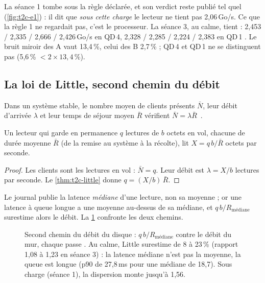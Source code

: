La séance 1 tombe sous la règle déclarée, et son verdict reste publié tel quel (\cref{fig:t2c-e1}) : il dit que \emph{sous cette charge} le lecteur ne tient pas 2,06\,Go/s. Ce que la règle 1 ne regardait pas, c'est le processeur. La séance 3, au calme, tient : 2,453 / 2,335 / 2,666 / 2,426\,Go/s en QD\,4, 2,328 / 2,285 / 2,224 / 2,383 en QD\,1 \mes. Le bruit miroir des A vaut 13,4\,\%, celui des B 2,7\,\% ; QD\,4 et QD\,1 ne se distinguent pas (5,6\,\% $< 2 \times 13{,}4\,\%$).

\subsection{La loi de Little, second chemin du débit}

\begin{theoreme}[Little, 1961]\label{thm:t2c-little}
Dans un système stable, le nombre moyen de clients présents $\bar N$, leur débit d'arrivée $\lambda$ et leur temps de séjour moyen $\bar R$ vérifient $\bar N = \lambda \bar R$~\cite{little1961}.
\end{theoreme}

\begin{corollaire}\label{cor:t2c-little}
Un lecteur qui garde en permanence $q$ lectures de $b$ octets en vol, chacune de durée moyenne $\bar R$ (de la remise au système à la récolte), lit $X = q\,b / \bar R$ octets par seconde.
\end{corollaire}

\begin{proof}
Les clients sont les lectures en vol : $\bar N = q$. Leur débit est $\lambda = X/b$ lectures par seconde. Le \cref{thm:t2c-little} donne $q = (X/b)\,\bar R$.
\end{proof}

Le journal publie la latence \emph{médiane} d'une lecture, non sa moyenne ; or une latence à queue longue a une moyenne au-dessus de sa médiane, et $q\,b/R_{\mathrm{médiane}}$ surestime alors le débit. La \cref{fig:t2c-little} confronte les deux chemins.

\begin{figure}[ht]
\centering
\GrapheChmLittle
\caption[La loi de Little contre le mur]{Second chemin du débit du disque : $q\,b/R_{\mathrm{médiane}}$ contre le débit du mur, chaque passe \mes. Au calme, Little surestime de 8 à 23\,\% (rapport 1,08 à 1,23 en séance 3) : la latence médiane n'est pas la moyenne, la queue est longue (p90 de 27,8\,ms pour une médiane de 18,7). Sous charge (séance 1), la dispersion monte jusqu'à 1,56.}
\label{fig:t2c-little}
\end{figure}

